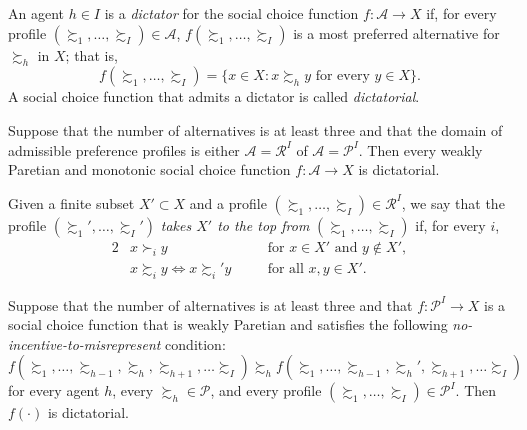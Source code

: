 \begin{defn}
    An agent $h \in I$ is a \emph{dictator} for the social choice function $f : \mathscr{A} \to X$ if, for every profile $(\succsim_1, \dots, \succsim_I) \in \mathscr{A}$, $f (\succsim_1, \dots, \succsim_I)$ is a most preferred alternative for $\succsim_h$ in $X$; that is,
    \begin{equation*}
        f (\succsim_1, \dots, \succsim_I) = \{x \in X : x \succsim_h y \text{ for every } y \in X\}.
    \end{equation*}
    A social choice function that admits a dictator is called \emph{dictatorial}.
\end{defn}

\begin{prop}
    Suppose that the number of alternatives is at least three and that the domain of admissible preference profiles is either $\mathscr{A} = \mathscr{R}^I$ of $\mathscr{A} = \mathscr{P}^I$. Then every weakly Paretian and monotonic social choice function $f : \mathscr{A} \to X$ is dictatorial.
\end{prop}

\begin{defn}
    Given a finite subset $X' \subset X$ and a profile $(\succsim_1, \dots, \succsim_I) \in \mathscr{R}^I$, we say that the profile $(\succsim_1', \dots, \succsim_I')$ \emph{takes $X'$ to the top from} $(\succsim_1, \dots, \succsim_I)$ if, for every $i$,
    \begin{alignat*}{2}
        &x \succ_i y && \text{for } x \in X' \text{ and } y \not\in X', \\
        &x \succsim_i y \iff x \succsim_i' y \quad && \text{for all } x, y \in X'.
    \end{alignat*}
\end{defn}

\begin{prop}
    Suppose that the number of alternatives is at least three and that $f : \mathscr{P}^I \to X$ is a social choice function that is weakly Paretian and satisfies the following \emph{no-incentive-to-misrepresent} condition:
    \begin{equation*}
        f (\succsim_1, \dots, \succsim_{h - 1}, \succsim_h, \succsim_{h + 1}, \dots \succsim_I) \succsim_h f (\succsim_1, \dots, \succsim_{h - 1}, \succsim_h', \succsim_{h + 1}, \dots \succsim_I)
    \end{equation*}
    for every agent $h$, every $\succsim_h \in \mathscr{P}$, and every profile $(\succsim_1, \dots, \succsim_I) \in \mathscr{P}^I$. Then $f(\cdot)$ is dictatorial.
\end{prop}
